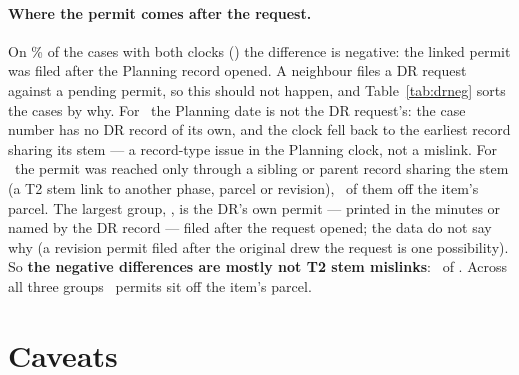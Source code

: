 \documentclass[11pt]{article}
\begin{document}
\paragraph{Where the permit comes after the request.} On \pcDrNegPct\% of the cases with both
clocks (\pcDrNegN) the difference is negative: the linked permit was filed after the Planning
record opened. A neighbour files a DR request against a pending permit, so this should not
happen, and Table~\ref{tab:drneg} sorts the cases by why. For \pcDrNegRecord\ the Planning date
is not the DR request's: the case number has no DR record of its own, and the clock fell back
to the earliest record sharing its stem --- a record-type issue in the Planning clock, not a
mislink. For \pcDrNegStem\ the permit was reached only through a sibling or parent record
sharing the stem (a T2 stem link to another phase, parcel or revision), \pcDrNegStemOff\ of them
off the item's parcel. The largest group, \pcDrNegOwn, is the DR's own permit --- printed in the
minutes or named by the DR record --- filed after the request opened; the data do not say why
(a revision permit filed after the original drew the request is one possibility). So
\textbf{the negative differences are mostly not T2 stem mislinks}: \pcDrNegStem\ of \pcDrNegN.
Across all three groups \pcDrNegOffParcel\ permits sit off the item's parcel.

\section{Caveats}
\label{sec:caveats}
\end{document}
